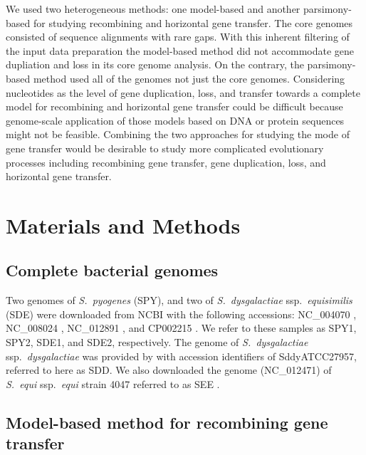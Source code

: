 \documentclass[english]{article}
\begin{document}
We used two heterogeneous methods: one model-based and another parsimony-based
for studying recombining and horizontal gene transfer.  The core genomes
consisted of sequence alignments with rare gaps. With this inherent filtering of
the input data preparation the model-based method did not accommodate gene
dupliation and loss in its core genome analysis. On the contrary, the
parsimony-based method used all of the genomes not just the core genomes.
Considering nucleotides as the level of gene duplication, loss, and transfer
towards a complete model for recombining and horizontal gene transfer could be
difficult because genome-scale application of those models based on DNA or
protein sequences might not be feasible.  Combining the two approaches for
studying the mode of gene transfer would be desirable to study more complicated
evolutionary processes including recombining gene transfer, gene duplication,
loss, and horizontal gene transfer.

\section{Materials and Methods}

\subsection{Complete bacterial genomes}

Two genomes of \textit{S.\ pyogenes} (SPY), and two of \textit{S.\ dysgalactiae}
ssp.\textit{\ equisimilis} (SDE) were downloaded from NCBI with the following
accessions: NC\_004070 \citep{Beres2002}, NC\_008024 \citep{Beres2006},
NC\_012891 \citep{Shimomura2011}, and CP002215 \citep{Suzuki2011}. We refer to
these samples as SPY1, SPY2, SDE1, and SDE2, respectively. The genome of
\textit{S.\ dysgalactiae} ssp.\textit{\ dysgalactiae} was provided by
\citet{Suzuki2011} with accession identifiers of SddyATCC27957, referred to here
as SDD. We also downloaded the genome (NC\_012471) of \textit{S.\ equi}
ssp.\textit{\ equi} strain 4047 referred to as SEE \citep{Holden2009}.

\subsection{Model-based method for recombining gene transfer}
\end{document}
